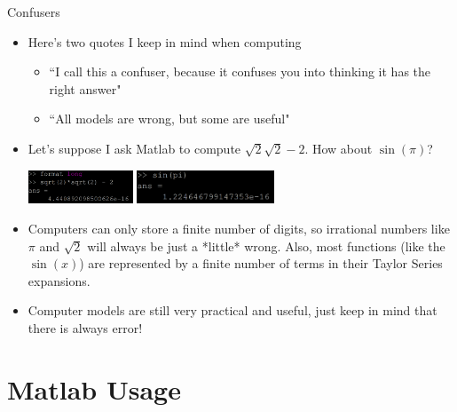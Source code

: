 {}\documentclass[letterpaper,
compress,
xcolor=x11names,
]{beamer}
\begin{document}
\begin{frame}{Confusers}
	\footnotesize
	\begin{itemize}
		\item Here's two quotes I keep in mind when computing
		\begin{itemize}
			\item ``I call this a confuser, because it confuses you into thinking it has the right answer"
			\item ``All models are wrong, but some are useful"
		\end{itemize}
		\item Let's suppose I ask Matlab to compute $\sqrt{2}\sqrt{2}-2$. How about $\sin(\pi)$?
		\begin{center}
			\includegraphics[height = 1cm]{sqrt2squared.png} \hspace{1cm}
			\includegraphics[height = 1cm]{sinpi.png}
		\end{center}
		\item Computers can only store a finite number of digits, so irrational numbers like $\pi$ and $\sqrt{2}$ will always be just a *little* wrong. Also, most functions (like the $\sin(x)$) are represented by a finite number of terms in their Taylor Series expansions.
		\item Computer models are still very practical and useful, just keep in mind that there is always error!
	\end{itemize}
\end{frame}

\section{Matlab Usage}
\end{document}
